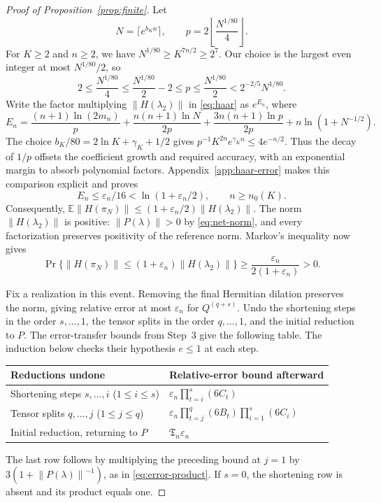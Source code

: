 \documentclass[11pt]{article}
\numberwithin{equation}{section}
\theoremstyle{boldremark}\newtheorem{remark}[theorem]{Remark}
\newcommand{\E}{\mathbb E}
\newcommand{\Prob}{\Pr}
\newcommand{\norm}[1]{\left\lVert #1\right\rVert}
\begin{document}
\begin{proof}[Proof of Proposition~\ref{prop:finite}]
Let
\[
 N=\lceil e^{b_Kn}\rceil,\qquad
 p=2\left\lfloor\frac{N^{1/80}}4\right\rfloor.
\]
For $K\ge2$ and $n\ge2$, we have $N^{1/80}\ge K^{7n/2}\ge2^7$.
Our choice is the largest even integer at most $N^{1/80}/2$, so
\[
 2\le\frac{N^{1/80}}4
 \le\frac{N^{1/80}}2-2\le p\le\frac{N^{1/80}}2
 <2^{-2/5}N^{1/80}.
\]
Write the factor multiplying $\norm{H(\lambda_2)}$ in
\eqref{eq:haar} as $e^{E_n}$, where
\begin{equation}
 E_n=\frac{(n+1)\ln(2m_n)}p
 +\frac{n(n+1)\ln N}{2p}
 +\frac{3n(n+1)\ln p}{2p}
 +n\ln(1+N^{-1/2}).
 \label{eq:En}
\end{equation}
The choice $b_K/80=2\ln K+\gamma_K+1/2$ gives
$p^{-1}K^{2n}e^{\gamma_Kn}\le4e^{-n/2}$.
Thus the decay of $1/p$ offsets the coefficient growth and required
accuracy, with an exponential margin to absorb polynomial factors.
Appendix~\ref{app:haar-error} makes this comparison explicit and proves
\begin{equation}
 E_n\le\varepsilon_n/16<\ln(1+\varepsilon_n/2),
 \qquad n\ge n_0(K).
 \label{eq:En-bound}
\end{equation}
Consequently,
$\E\norm{H(\pi_N)}\le(1+\varepsilon_n/2)\norm{H(\lambda_2)}$.
The norm $\norm{H(\lambda_2)}$ is positive: $\norm{P(\lambda)}>0$ by
\eqref{eq:net-norm}, and every factorization preserves positivity of
the reference norm. Markov's inequality now gives
\begin{equation}
 \Prob\{\norm{H(\pi_N)}\le(1+\varepsilon_n)\norm{H(\lambda_2)}\}
 \ge\frac{\varepsilon_n}{2(1+\varepsilon_n)}>0.
 \label{eq:positive-probability}
\end{equation}

Fix a realization in this event. Removing the final Hermitian
dilation preserves the norm, giving relative error at most
$\varepsilon_n$ for $Q^{(q+s)}$.
Undo the shortening steps in the order $s,\ldots,1$, the tensor
splits in the order $q,\ldots,1$, and the initial reduction to $P$.
The error-transfer bounds from Step~3 give the following table.
The induction below checks their hypothesis $e\le1$ at each step.
\begin{center}
\begin{tabular}{@{}ll@{}}
\toprule
Reductions undone & Relative-error bound afterward \\
\midrule
Shortening steps $s,\ldots,i$ ($1\le i\le s$)
 & $\displaystyle\varepsilon_n\prod_{t=i}^s(6C_t)$ \\[8pt]
Tensor splits $q,\ldots,j$ ($1\le j\le q$)
 & $\displaystyle\varepsilon_n\prod_{t=j}^q(6B_t)
                      \prod_{i=1}^s(6C_i)$ \\[8pt]
Initial reduction, returning to $P$
 & $\displaystyle\mathfrak T_n\varepsilon_n$ \\
\bottomrule
\end{tabular}
\end{center}
The last row follows by multiplying the preceding bound at $j=1$
by $3(1+\norm{P(\lambda)}^{-1})$, as in \eqref{eq:error-product}.
If $s=0$, the shortening row is absent and its product equals one.


\end{proof}
\end{document}
